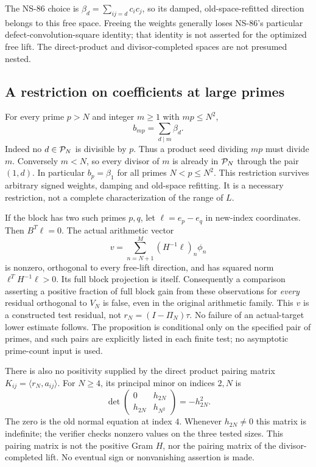 The NS-86 choice is $\beta_d=\sum_{ij=d}c_ic_j$, so its damped,
old-space-refitted direction belongs to this free space. Freeing the
weights generally loses NS-86's particular defect-convolution-square
identity; that identity is not asserted for the optimized free lift.
The direct-product and divisor-completed spaces are not presumed nested.

\subsection{A restriction on coefficients at large primes}
For every prime $p>N$ and integer $m\ge1$ with $mp\le N^2$,
\begin{equation}
 b_{mp}=\sum_{d\mid m}\beta_d.
 \label{eq:ns95-prime-fiber}
\end{equation}
Indeed no $d\in{\cal P}_N$ is divisible by $p$. Thus a product seed
dividing $mp$ must divide $m$. Conversely $m<N$, so every divisor of $m$
is already in ${\cal P}_N$ through the pair $(1,d)$. In particular
$b_p=\beta_1$ for all primes $N<p\le N^2$. This restriction survives
arbitrary signed weights, damping and old-space refitting. It is a
necessary restriction, not a complete characterization of the range of $L$.

If the block has two such primes $p,q$, let $\ell=e_p-e_q$ in new-index
coordinates. Then $B^T\ell=0$. The actual arithmetic vector
\[
 v=\sum_{n=N+1}^{M}(H^{-1}\ell)_n\phi_n
\]
is nonzero, orthogonal to every free-lift direction, and has squared
norm $\ell^TH^{-1}\ell>0$. Its full block projection is itself.
Consequently a comparison asserting a positive fraction of full block
gain from these observations for \emph{every} residual orthogonal to
$V_N$ is false, even in the original arithmetic family. This $v$ is a
constructed test residual, not $r_N=(I-\Pi_N)\tau$. No failure of an
actual-target lower estimate follows. The proposition is conditional
only on the specified pair of primes, and such pairs are explicitly
listed in each finite test; no asymptotic prime-count input is used.

There is also no positivity supplied by the direct product pairing
matrix $K_{ij}=\langle r_N,a_{ij}\rangle$. For $N\ge4$, its principal
minor on indices $2,N$ is
\[
 \det\begin{pmatrix}0&h_{2N}\\h_{2N}&h_{N^2}\end{pmatrix}
       =-h_{2N}^2.
\]
The zero is the old normal equation at index $4$. Whenever $h_{2N}\ne0$
this matrix is indefinite; the verifier checks nonzero values on the
three tested sizes. This pairing matrix is not the positive Gram $H$,
nor the pairing matrix of the divisor-completed lift. No eventual sign
or nonvanishing assertion is made.

